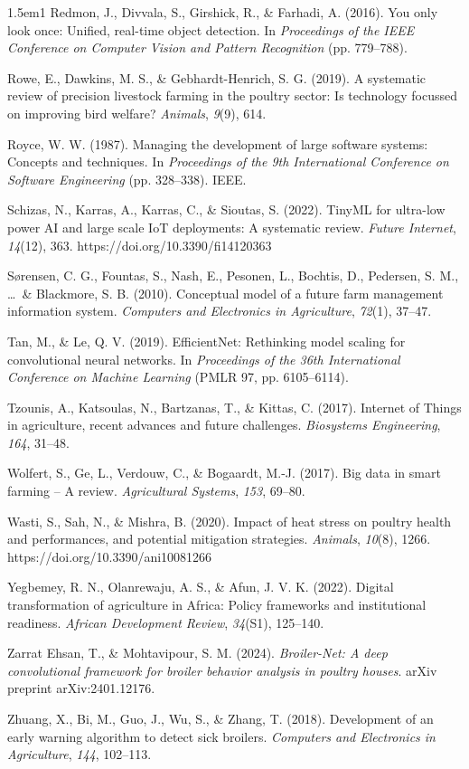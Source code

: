 \documentclass[12pt,a4paper]{report}
\begin{document}
\begin{hangparas}{1.5em}{1}
Redmon, J., Divvala, S., Girshick, R., \& Farhadi, A. (2016). You only look once: Unified, real-time object detection. In \textit{Proceedings of the IEEE Conference on Computer Vision and Pattern Recognition} (pp. 779--788).

Rowe, E., Dawkins, M. S., \& Gebhardt-Henrich, S. G. (2019). A systematic review of precision livestock farming in the poultry sector: Is technology focussed on improving bird welfare? \textit{Animals}, \textit{9}(9), 614.

Royce, W. W. (1987). Managing the development of large software systems: Concepts and techniques. In \textit{Proceedings of the 9th International Conference on Software Engineering} (pp. 328--338). IEEE.

Schizas, N., Karras, A., Karras, C., \& Sioutas, S. (2022). TinyML for ultra-low power AI and large scale IoT deployments: A systematic review. \textit{Future Internet}, \textit{14}(12), 363. https://doi.org/10.3390/fi14120363

S{\o}rensen, C. G., Fountas, S., Nash, E., Pesonen, L., Bochtis, D., Pedersen, S. M., \ldots\ \& Blackmore, S. B. (2010). Conceptual model of a future farm management information system. \textit{Computers and Electronics in Agriculture}, \textit{72}(1), 37--47.

Tan, M., \& Le, Q. V. (2019). EfficientNet: Rethinking model scaling for convolutional neural networks. In \textit{Proceedings of the 36th International Conference on Machine Learning} (PMLR 97, pp. 6105--6114).

Tzounis, A., Katsoulas, N., Bartzanas, T., \& Kittas, C. (2017). Internet of Things in agriculture, recent advances and future challenges. \textit{Biosystems Engineering}, \textit{164}, 31--48.

Wolfert, S., Ge, L., Verdouw, C., \& Bogaardt, M.-J. (2017). Big data in smart farming -- A review. \textit{Agricultural Systems}, \textit{153}, 69--80.

Wasti, S., Sah, N., \& Mishra, B. (2020). Impact of heat stress on poultry health and performances, and potential mitigation strategies. \textit{Animals}, \textit{10}(8), 1266. https://doi.org/10.3390/ani10081266

Yegbemey, R. N., Olanrewaju, A. S., \& Afun, J. V. K. (2022). Digital transformation of agriculture in Africa: Policy frameworks and institutional readiness. \textit{African Development Review}, \textit{34}(S1), 125--140.

Zarrat Ehsan, T., \& Mohtavipour, S. M. (2024). \textit{Broiler-Net: A deep convolutional framework for broiler behavior analysis in poultry houses}. arXiv preprint arXiv:2401.12176.

Zhuang, X., Bi, M., Guo, J., Wu, S., \& Zhang, T. (2018). Development of an early warning algorithm to detect sick broilers. \textit{Computers and Electronics in Agriculture}, \textit{144}, 102--113.

\end{hangparas}
\end{document}
